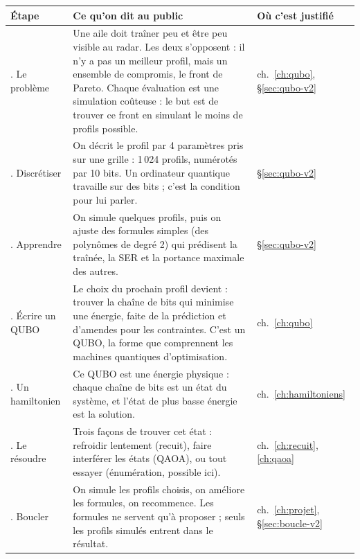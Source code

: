 \begin{center}
\renewcommand{\arraystretch}{1.3}
\small
\begin{tabularx}{\linewidth}{>{\raggedright\arraybackslash}p{2.3cm}>{\raggedright\arraybackslash}X>{\raggedright\arraybackslash}p{2.3cm}}
\toprule
Étape & Ce qu'on dit au public & Où c'est justifié \\
\midrule
1. Le problème & Une aile doit traîner peu et être peu visible au radar. Les deux s'opposent : il n'y a pas un meilleur profil, mais un ensemble de compromis, le front de Pareto. Chaque évaluation est une simulation coûteuse : le but est de trouver ce front en simulant le moins de profils possible. & ch.~\ref{ch:qubo}, §\ref{sec:qubo-v2} \\
2. Discrétiser & On décrit le profil par 4 paramètres pris sur une grille : 1\,024 profils, numérotés par 10 bits. Un ordinateur quantique travaille sur des bits ; c'est la condition pour lui parler. & §\ref{sec:qubo-v2} \\
3. Apprendre & On simule quelques profils, puis on ajuste des formules simples (des polynômes de degré 2) qui prédisent la traînée, la SER et la portance maximale des autres. & §\ref{sec:qubo-v2} \\
4. Écrire un QUBO & Le choix du prochain profil devient : trouver la chaîne de bits qui minimise une énergie, faite de la prédiction et d'amendes pour les contraintes. C'est un QUBO, la forme que comprennent les machines quantiques d'optimisation. & ch.~\ref{ch:qubo} \\
5. Un hamiltonien & Ce QUBO est une énergie physique : chaque chaîne de bits est un état du système, et l'état de plus basse énergie est la solution. & ch.~\ref{ch:hamiltoniens} \\
6. Le résoudre & Trois façons de trouver cet état : refroidir lentement (recuit), faire interférer les états (QAOA), ou tout essayer (énumération, possible ici). & ch.~\ref{ch:recuit}, \ref{ch:qaoa} \\
7. Boucler & On simule les profils choisis, on améliore les formules, on recommence. Les formules ne servent qu'à proposer ; seuls les profils simulés entrent dans le résultat. & ch.~\ref{ch:projet}, §\ref{sec:boucle-v2} \\
\bottomrule
\end{tabularx}
\end{center}

